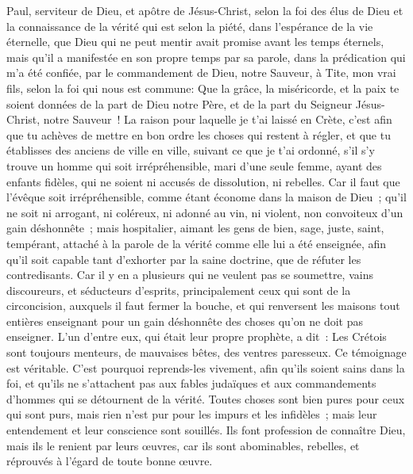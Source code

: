 \begin{multicols}{2}
\VerseOne{}Paul, serviteur de Dieu, et apôtre de Jésus-Christ, selon la foi des élus de Dieu et la connaissance de la vérité qui est selon la piété,
dans l'espérance de la vie éternelle, que Dieu qui ne peut mentir avait promise avant les temps éternels,
mais qu'il a manifestée en son propre temps par sa parole, dans la prédication qui m'a été confiée, par le commandement de Dieu, notre Sauveur,
à Tite, mon vrai fils, selon la foi qui nous est commune: Que la grâce, la miséricorde, et la paix te soient données de la part de Dieu notre Père, et de la part du Seigneur Jésus-Christ, notre Sauveur~!
La raison pour laquelle je t'ai laissé en Crète, c'est afin que tu achèves de mettre en bon ordre les choses qui restent à régler, et que tu établisses des anciens de ville en ville, suivant ce que je t'ai ordonné,
s'il s'y trouve un homme qui soit irrépréhensible, mari d'une seule femme, ayant des enfants fidèles, qui ne soient ni accusés de dissolution, ni rebelles.
Car il faut que l'évêque soit irrépréhensible, comme étant économe dans la maison de Dieu~; qu'il ne soit ni arrogant, ni coléreux, ni adonné au vin, ni violent, non convoiteux d'un gain déshonnête~;
mais hospitalier, aimant les gens de bien, sage, juste, saint, tempérant,
attaché à la parole de la vérité comme elle lui a été enseignée, afin qu'il soit capable tant d'exhorter par la saine doctrine, que de réfuter les contredisants.
Car il y en a plusieurs qui ne veulent pas se soumettre, vains discoureurs, et séducteurs d'esprits, principalement ceux qui sont de la circoncision,
auxquels il faut fermer la bouche, et qui renversent les maisons tout entières enseignant pour un gain déshonnête des choses qu'on ne doit pas enseigner.
L'un d'entre eux, qui était leur propre prophète, a dit~: Les Crétois sont toujours menteurs, de mauvaises bêtes, des ventres paresseux.
Ce témoignage est véritable. C'est pourquoi reprends-les vivement, afin qu'ils soient sains dans la foi,
et qu'ils ne s'attachent pas aux fables judaïques et aux commandements d'hommes qui se détournent de la vérité.
Toutes choses sont bien pures pour ceux qui sont purs, mais rien n'est pur pour les impurs et les infidèles~; mais leur entendement et leur conscience sont souillés.
Ils font profession de connaître Dieu, mais ils le renient par leurs œuvres, car ils sont abominables, rebelles, et réprouvés à l'égard de toute bonne œuvre.

\end{multicols}
